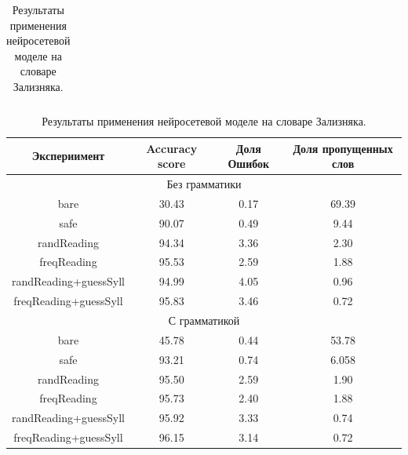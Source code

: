 \documentclass[14pt, a4paper, russian]{report}
\begin{document}
\begin{normalsize}
\begin{table}[H]
\begin{small}
\begin{center}
\begin{tabular}{|c|c|c|c|}
			\end{tabular}
		\end{center}
	\end{small}
	\caption{Результаты применения нейросетевой моделе на словаре Зализняка.}
	\label{table:dict_res}
\end{table}

\begin{table}[H]
	\begin{small}
		\begin{center}
			\begin{tabular}{|c|c|c|c|}
				\hline
				Экспериимент & Accuracy score & Доля Ошибок & Доля пропущенных слов\\
				\hline
				\multicolumn{4}{|c|}{Без грамматики} \\			
				\hline
				bare & 30.43 & 0.17 & 69.39 \\
				\hline
				safe & 90.07 & 0.49 & 9.44 \\
				\hline
				randReading &94.34 &3.36 &2.30 \\
				\hline
				freqReading &95.53 &2.59& 1.88 \\
				\hline
				randReading+guessSyll &94.99 &4.05 &0.96 \\
				\hline
				freqReading+guessSyll & 95.83 &3.46 &0.72\\
				\hline
				\multicolumn{4}{|c|}{С грамматикой} \\			
				\hline
				bare &45.78 & 0.44 &53.78\\
				\hline
				safe &93.21& 0.74 &6.058 \\
				\hline
				randReading &95.50 &2.59 &1.90 \\
				\hline
				freqReading &95.73 &2.40 &1.88 \\
				\hline
				randReading+guessSyll &95.92 &3.33 &0.74 \\
				\hline
				freqReading+guessSyll &96.15 &3.14 &0.72 \\
				\hline
				
			\end{tabular}
		\end{center}
	\end{small}
	\caption{Результаты применения нейросетевой моделе на словаре Зализняка.}
	\label{table:base_text}
\end{table}


\end{normalsize}
\end{document}
